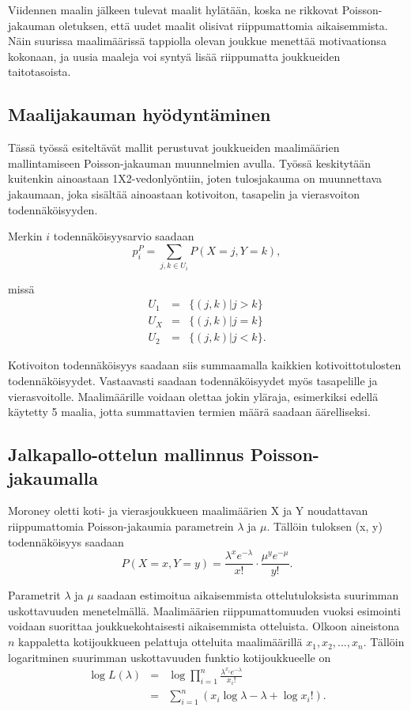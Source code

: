 \documentclass[a4paper,finnish,titlepage,12pt]{article}
\begin{document}
Viidennen maalin jälkeen tulevat maalit hylätään, koska ne rikkovat Poisson-jakauman oletuksen, että uudet maalit olisivat riippumattomia aikaisemmista. Näin suurissa maalimäärissä tappiolla olevan joukkue menettää motivaationsa kokonaan, ja uusia maaleja voi syntyä lisää riippumatta joukkueiden taitotasoista.


\subsection{Maalijakauman hyödyntäminen}
Tässä työssä esiteltävät mallit perustuvat joukkueiden maalimäärien mallintamiseen Poisson-jakauman muunnelmien avulla. Työssä keskitytään kuitenkin ainoastaan 1X2-vedonlyöntiin, joten tulosjakauma on muunnettava jakaumaan, joka sisältää ainoastaan kotivoiton, tasapelin ja vierasvoiton todennäköisyyden.

Merkin $i$ todennäköisyysarvio saadaan
\begin{equation}
	p_{i}^{P} = \sum_{j,k \in U_i} P(X=j, Y=k),
\end{equation}

missä
\begin{eqnarray*}
	U_1 &=& \{(j,k)|j>k\} \\
	U_X &=& \{(j,k)|j=k\} \\
	U_2 &=& \{(j,k)|j<k\}.
\end{eqnarray*}

Kotivoiton todennäköisyys saadaan siis summaamalla kaikkien kotivoittotulosten todennäköisyydet. Vastaavasti saadaan todennäköisyydet myös tasapelille ja vierasvoitolle. Maalimäärille voidaan olettaa jokin yläraja, esimerkiksi edellä käytetty 5 maalia, jotta summattavien termien määrä saadaan äärelliseksi.



\subsection{Jalkapallo-ottelun mallinnus Poisson-jakaumalla}
Moroney \cite{moroney} oletti koti- ja vierasjoukkueen maalimäärien X ja Y noudattavan riippumattomia Poisson-jakaumia parametrein $\lambda$ ja $\mu$.
Tällöin tuloksen (x, y) todennäköisyys saadaan
\begin{equation}
	P(X = x, Y = y) = \frac{\lambda^x e^{-\lambda}}{x!} \cdot \frac{\mu^y e^{-\mu}}{y!}.
\end{equation}

Parametrit $\lambda$ ja $\mu$ saadaan estimoitua aikaisemmista ottelutuloksista suurimman uskottavuuden menetelmällä. Maalimäärien riippumattomuuden vuoksi esimointi voidaan suorittaa joukkuekohtaisesti aikaisemmista otteluista. Olkoon aineistona $n$ kappaletta kotijoukkueen pelattuja otteluita maalimäärillä $x_1, x_2, ..., x_n$. Tällöin logaritminen suurimman uskottavuuden funktio kotijoukkueelle on
\begin{eqnarray}
	\log{L(\lambda)} &=& \log{\prod_{i=1}^{n} \frac{\lambda^{x_i} e^{-\lambda}}{x_i!}} \\
	&=& \sum_{i=1}^{n} (x_i \log{\lambda} - \lambda + \log{x_i!}).
\end{eqnarray}
\end{document}
